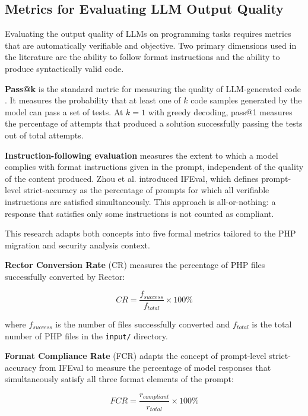 \subsection{Metrics for Evaluating LLM Output Quality}
\label{subsec:metrik-llm}

Evaluating the output quality of LLMs on programming tasks requires metrics that are automatically verifiable and objective. Two primary dimensions used in the literature are the ability to follow format instructions and the ability to produce syntactically valid code.

\textbf{Pass@k} is the standard metric for measuring the quality of LLM-generated code \cite{roziere2024codellama}\cite{hui2024qwen}. It measures the probability that at least one of $k$ code samples generated by the model can pass a set of tests. At $k=1$ with greedy decoding, pass@1 measures the percentage of attempts that produced a solution successfully passing the tests out of total attempts.

\textbf{Instruction-following evaluation} measures the extent to which a model complies with format instructions given in the prompt, independent of the quality of the content produced. Zhou et al. \cite{zhou2023ifeval} introduced IFEval, which defines prompt-level strict-accuracy as the percentage of prompts for which all verifiable instructions are satisfied simultaneously. This approach is all-or-nothing: a response that satisfies only some instructions is not counted as compliant.

This research adapts both concepts into five formal metrics tailored to the PHP migration and security analysis context.

\textbf{Rector Conversion Rate} (CR) measures the percentage of PHP files successfully converted by Rector:

\begin{equation}
    CR = \frac{f_{success}}{f_{total}} \times 100\%
    \label{eq:cr}
\end{equation}

where $f_{success}$ is the number of files successfully converted and $f_{total}$ is the total number of PHP files in the \texttt{input/} directory.

\textbf{Format Compliance Rate} (FCR) adapts the concept of prompt-level strict-accuracy from IFEval \cite{zhou2023ifeval} to measure the percentage of model responses that simultaneously satisfy all three format elements of the prompt:

\begin{equation}
    FCR = \frac{r_{compliant}}{r_{total}} \times 100\%
    \label{eq:fcr}
\end{equation}

